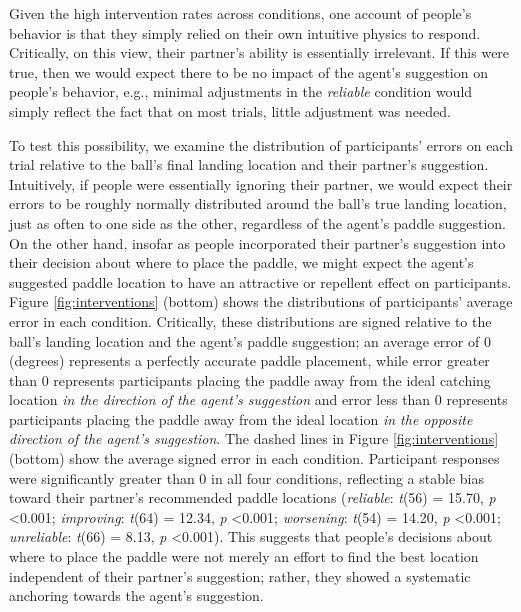 \documentclass[10pt,letterpaper]{article}
\begin{document}
Given the high intervention rates across conditions, one account of people's behavior is that they simply relied on their own intuitive physics to respond. Critically, on this view, their partner's ability is essentially irrelevant. If this were true, then we would expect there to be no impact of the agent's suggestion on people's behavior, e.g., minimal adjustments in the \textit{reliable} condition would simply reflect the fact that on most trials, little adjustment was needed. 

To test this possibility, we examine the distribution of participants' errors on each trial relative to the ball's final landing location and their partner's suggestion. Intuitively, if people were essentially ignoring their partner, we would expect their errors to be roughly normally distributed around the ball's true landing location, just as often to one side as the other, regardless of the agent's paddle suggestion. On the other hand, insofar as people incorporated their partner's suggestion into their decision about where to place the paddle, we might expect the agent's suggested paddle location to have an attractive or repellent effect on participants. Figure \ref{fig:interventions} (bottom) shows the distributions of participants' average error in each condition. Critically, these distributions are signed relative to the ball's landing location and the agent's paddle suggestion; an average error of 0 (degrees) represents a perfectly accurate paddle placement, while error greater than 0 represents participants placing the paddle away from the ideal catching location \textit{in the direction of the agent's suggestion} and error less than 0 represents participants placing the paddle away from the ideal location \textit{in the opposite direction of the agent's suggestion}. The dashed lines in Figure \ref{fig:interventions} (bottom) show the average signed error in each condition. Participant responses were significantly greater than 0 in all four conditions, reflecting a stable bias toward their partner's recommended paddle locations (\textit{reliable}: \textit{t}(56) = 15.70, \textit{p} \textless{0.001}; \textit{improving}: \textit{t}(64) = 12.34, \textit{p} \textless{0.001}; \textit{worsening}: \textit{t}(54) = 14.20, \textit{p} \textless{0.001}; \textit{unreliable}: \textit{t}(66) = 8.13, \textit{p} \textless{0.001}). This suggests that people's decisions about where to place the paddle were not merely an effort to find the best location independent of their partner's suggestion; rather, they showed a systematic anchoring towards the agent's suggestion.
\end{document}
